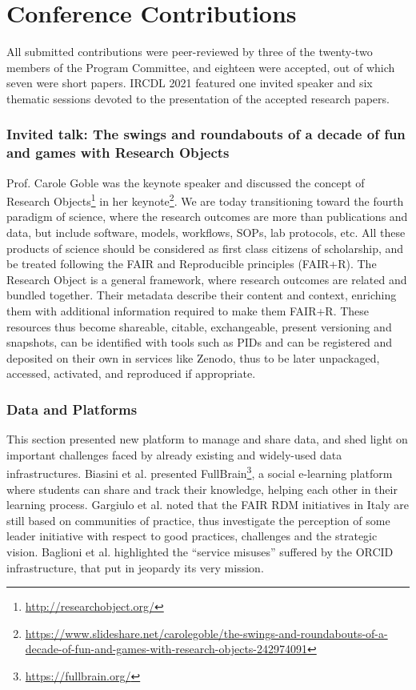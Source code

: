 \documentclass{sig-alternate-10pt}
\begin{document}
\section{Conference Contributions}
All submitted contributions were peer-reviewed by three of the twenty-two members of the Program Committee, and eighteen were accepted, out of which seven were short papers. IRCDL 2021 featured one invited speaker and six thematic sessions devoted to the presentation of the accepted research papers.

\subsubsection*{Invited talk: The swings and roundabouts of a decade of fun and games with Research Objects} Prof. Carole Goble was the keynote speaker and discussed the concept of Research Objects\footnote{\url{http://researchobject.org/}}\cite{bechhofer2013linked} in her keynote\footnote{\url{https://www.slideshare.net/carolegoble/the-swings-and-roundabouts-of-a-decade-of-fun-and-games-with-research-objects-242974091}}. We are today transitioning toward the fourth paradigm of science, where the research outcomes are more than publications and data, but include software, models, workflows, SOPs, lab protocols, etc. All these products of science should be considered as first class citizens of scholarship, and be treated following the FAIR and Reproducible principles (FAIR+R). 
The Research Object is a general framework, where research outcomes are related and bundled together. Their metadata describe their content and context, enriching them with additional information required to make them FAIR+R. These resources thus become shareable, citable, exchangeable, present versioning and snapshots, can be identified with tools such as PIDs and can be registered and deposited on their own in services like Zenodo, thus to be later unpackaged, accessed, activated, and reproduced if appropriate. 

\subsubsection*{Data and Platforms}
This section presented new platform to manage and share data, and shed light on important challenges faced by already existing and widely-used data infrastructures.
Biasini et al. \cite{biasini2021fullbrain} presented FullBrain\footnote{\url{https://fullbrain.org/}}, a social e-learning platform where students can share and track their knowledge, helping each other in their learning process.
Gargiulo et al. \cite{GargiuloGTZ21} noted that the FAIR RDM initiatives in Italy are still based on communities of practice, thus investigate the perception of some leader initiative with respect to good practices, challenges and the strategic vision. 
Baglioni et al. \cite{BaglioniMMABB21} highlighted the ``service misuses'' suffered by the ORCID infrastructure, that put in jeopardy its very mission.
\end{document}
